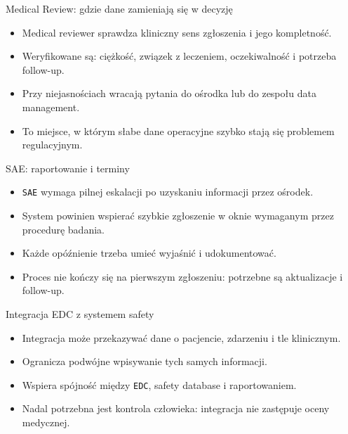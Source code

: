 \begin{frame}{Medical Review: gdzie dane zamieniają się w decyzję}
  \begin{itemize}
    \item Medical reviewer sprawdza kliniczny sens zgłoszenia i jego kompletność.
    \item Weryfikowane są: ciężkość, związek z leczeniem, oczekiwalność i potrzeba follow-up.
    \item Przy niejasnościach wracają pytania do ośrodka lub do zespołu data management.
    \item To miejsce, w którym słabe dane operacyjne szybko stają się problemem regulacyjnym.
  \end{itemize}
\end{frame}

\begin{frame}{SAE: raportowanie i terminy}
  \begin{itemize}
    \item \texttt{SAE} wymaga pilnej eskalacji po uzyskaniu informacji przez ośrodek.
    \item System powinien wspierać szybkie zgłoszenie w oknie wymaganym przez procedurę badania.
    \item Każde opóźnienie trzeba umieć wyjaśnić i udokumentować.
    \item Proces nie kończy się na pierwszym zgłoszeniu: potrzebne są aktualizacje i follow-up.
  \end{itemize}
\end{frame}

\begin{frame}{Integracja EDC z systemem safety}
  \begin{itemize}
    \item Integracja może przekazywać dane o pacjencie, zdarzeniu i tle klinicznym.
    \item Ogranicza podwójne wpisywanie tych samych informacji.
    \item Wspiera spójność między \texttt{EDC}, safety database i raportowaniem.
    \item Nadal potrzebna jest kontrola człowieka: integracja nie zastępuje oceny medycznej.
  \end{itemize}
\end{frame}

